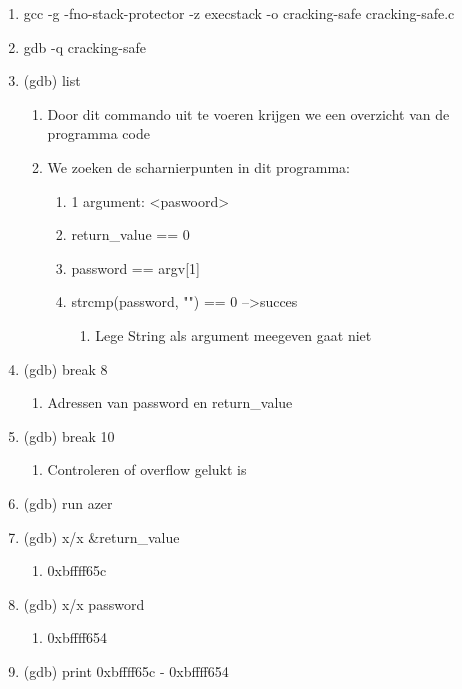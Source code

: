 \begin{enumerate}
  \item gcc -g -fno-stack-protector -z execstack -o cracking-safe cracking-safe.c
  \item gdb -q cracking-safe
  \item (gdb) list
  	\begin{enumerate}
  	\item Door dit commando uit te voeren krijgen we een overzicht van de programma code
  	\item We zoeken de scharnierpunten in dit programma:
  		\begin{enumerate}
  		\item 1 argument: \textless paswoord\textgreater
  		\item return\_value == 0
  		\item password == argv[1]
  		\item strcmp(password, "") == 0 --\textgreater succes
  			\begin{enumerate}
  			\item Lege String als argument meegeven gaat niet
  			\end{enumerate}
  		\end{enumerate}
  	\end{enumerate}
  \item (gdb) break 8
  		\begin{enumerate}
  		\item Adressen van password en return\_value  			
  		\end{enumerate}
  \item (gdb) break 10
  		\begin{enumerate}
  		\item Controleren of overflow gelukt is  			
  		\end{enumerate}
  \item (gdb) run azer
  		\item (gdb) x/x \&return\_value
  			\begin{enumerate}
  			\item 0xbffff65c
  			\end{enumerate}
  		\item (gdb) x/x password
  			\begin{enumerate}
  			\item 0xbffff654
  			\end{enumerate}
  	\item (gdb) print 0xbffff65c - 0xbffff654
  		\begin{enumerate}

\end{enumerate}
\end{enumerate}

